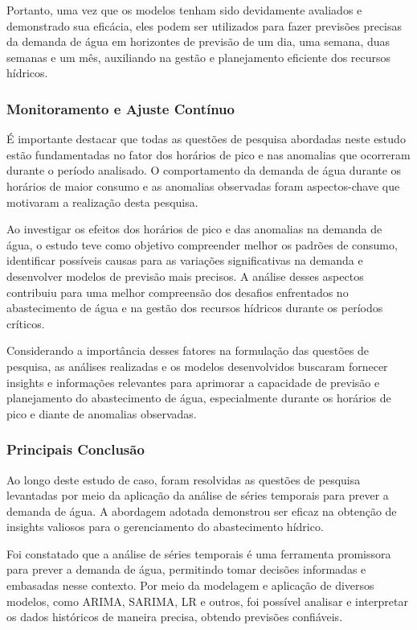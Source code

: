Portanto, uma vez que os modelos tenham sido devidamente avaliados e demonstrado sua eficácia, eles podem ser utilizados para fazer previsões precisas da demanda de água em horizontes de previsão de um dia, uma semana, duas semanas e um mês, auxiliando na gestão e planejamento eficiente dos recursos hídricos.

\subsubsection{Monitoramento e Ajuste Cont\'inuo}


É importante destacar que todas as questões de pesquisa abordadas neste estudo estão fundamentadas no fator dos horários de pico e nas anomalias que ocorreram durante o período analisado. O comportamento da demanda de água durante os horários de maior consumo e as anomalias observadas foram aspectos-chave que motivaram a realização desta pesquisa.

Ao investigar os efeitos dos horários de pico e das anomalias na demanda de água, o estudo teve como objetivo compreender melhor os padrões de consumo, identificar possíveis causas para as variações significativas na demanda e desenvolver modelos de previsão mais precisos. A análise desses aspectos contribuiu para uma melhor compreensão dos desafios enfrentados no abastecimento de água e na gestão dos recursos hídricos durante os períodos críticos.

Considerando a importância desses fatores na formulação das questões de pesquisa, as análises realizadas e os modelos desenvolvidos buscaram fornecer insights e informações relevantes para aprimorar a capacidade de previsão e planejamento do abastecimento de água, especialmente durante os horários de pico e diante de anomalias observadas.

\subsubsection{Principais Conclus\~ao}


Ao longo deste estudo de caso, foram resolvidas as questões de pesquisa levantadas por meio da aplicação da análise de séries temporais para prever a demanda de água. A abordagem adotada demonstrou ser eficaz na obtenção de insights valiosos para o gerenciamento do abastecimento hídrico.

Foi constatado que a análise de séries temporais é uma ferramenta promissora para prever a demanda de água, permitindo tomar decisões informadas e embasadas nesse contexto. Por meio da modelagem e aplicação de diversos modelos, como ARIMA, SARIMA, LR e outros, foi possível analisar e interpretar os dados históricos de maneira precisa, obtendo previsões confiáveis.


